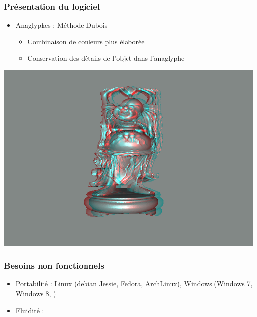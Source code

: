 \documentclass{beamer}
\begin{document}
%
\begin{frame}
\frametitle{Présentation du logiciel}
\begin{itemize}[label=$\bullet$]
\item Anaglyphes : Méthode Dubois \cite{algoDubois}
	\begin{itemize}[label=$\circ$]
	\item Combinaison de couleurs plus élaborée
	\item Conservation des détails de l'objet dans l'anaglyphe 
	\end{itemize}
\end{itemize}
\centering
\includegraphics[scale=0.35]{happy_dubois.png}

\end{frame}


\begin{frame}
\frametitle{Besoins non fonctionnels}
\begin{itemize}[label=$\bullet$]
 	\item Portabilité : Linux (debian Jessie, Fedora, ArchLinux), Windows (Windows 7, Windows 8, )
	\item Fluidité : 
\end{itemize}

\end{frame}

\end{document}
